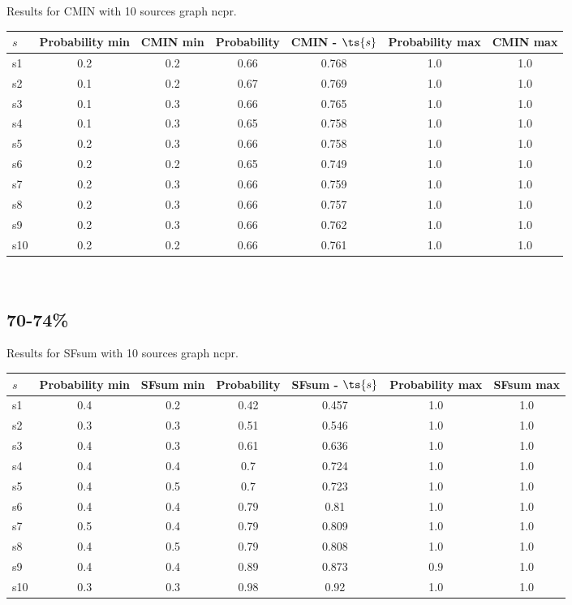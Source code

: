 \documentclass{article}
\begin{document}
\noindent Results for CMIN with 10 sources graph ncpr.

\noindent\begin{tabular}{|l|c|c|c|c|c|c|}
\hline
$s$& Probability min & CMIN min & Probability & CMIN - $\ts{s}$ & Probability max & CMIN max\\
\hline
s1 &0.2 & 0.2 & 0.66 & 0.768 & 1.0 & 1.0\\
\hline
s2 &0.1 & 0.2 & 0.67 & 0.769 & 1.0 & 1.0\\
\hline
s3 &0.1 & 0.3 & 0.66 & 0.765 & 1.0 & 1.0\\
\hline
s4 &0.1 & 0.3 & 0.65 & 0.758 & 1.0 & 1.0\\
\hline
s5 &0.2 & 0.3 & 0.66 & 0.758 & 1.0 & 1.0\\
\hline
s6 &0.2 & 0.2 & 0.65 & 0.749 & 1.0 & 1.0\\
\hline
s7 &0.2 & 0.3 & 0.66 & 0.759 & 1.0 & 1.0\\
\hline
s8 &0.2 & 0.3 & 0.66 & 0.757 & 1.0 & 1.0\\
\hline
s9 &0.2 & 0.3 & 0.66 & 0.762 & 1.0 & 1.0\\
\hline
s10 &0.2 & 0.2 & 0.66 & 0.761 & 1.0 & 1.0\\
\hline
\end{tabular}\\

\newpage

\subsection{70-74\%}

\noindent Results for SFsum with 10 sources graph ncpr.

\noindent\begin{tabular}{|l|c|c|c|c|c|c|}
\hline
$s$& Probability min & SFsum min & Probability & SFsum - $\ts{s}$ & Probability max & SFsum max\\
\hline
s1 &0.4 & 0.2 & 0.42 & 0.457 & 1.0 & 1.0\\
\hline
s2 &0.3 & 0.3 & 0.51 & 0.546 & 1.0 & 1.0\\
\hline
s3 &0.4 & 0.3 & 0.61 & 0.636 & 1.0 & 1.0\\
\hline
s4 &0.4 & 0.4 & 0.7 & 0.724 & 1.0 & 1.0\\
\hline
s5 &0.4 & 0.5 & 0.7 & 0.723 & 1.0 & 1.0\\
\hline
s6 &0.4 & 0.4 & 0.79 & 0.81 & 1.0 & 1.0\\
\hline
s7 &0.5 & 0.4 & 0.79 & 0.809 & 1.0 & 1.0\\
\hline
s8 &0.4 & 0.5 & 0.79 & 0.808 & 1.0 & 1.0\\
\hline
s9 &0.4 & 0.4 & 0.89 & 0.873 & 0.9 & 1.0\\
\hline
s10 &0.3 & 0.3 & 0.98 & 0.92 & 1.0 & 1.0\\
\hline
\end{tabular}\\
\end{document}
